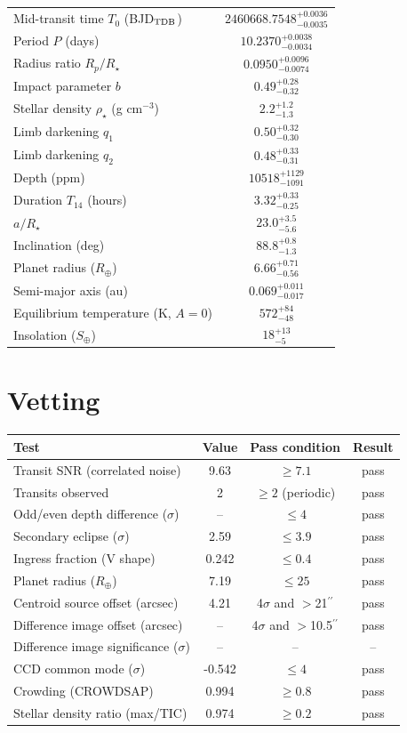 \documentclass[11pt,a4paper]{article}
\newcommand{\arcsec}{$^{\prime\prime}$}
\begin{document}
\begin{tabular}{lc}\toprule
Mid-transit time $T_0$ (BJD$_{\rm TDB}$) & $2460668.7548^{+0.0036}_{-0.0035}$ \\
Period $P$ (days) & $10.2370^{+0.0038}_{-0.0034}$ \\
Radius ratio $R_p/R_\star$ & $0.0950^{+0.0096}_{-0.0074}$ \\
Impact parameter $b$ & $0.49^{+0.28}_{-0.32}$ \\
Stellar density $\rho_\star$ (g cm$^{-3}$) & $2.2^{+1.2}_{-1.3}$ \\
Limb darkening $q_1$ & $0.50^{+0.32}_{-0.30}$ \\
Limb darkening $q_2$ & $0.48^{+0.33}_{-0.31}$ \\
Depth (ppm) & $10518^{+1129}_{-1091}$ \\
Duration $T_{14}$ (hours) & $3.32^{+0.33}_{-0.25}$ \\
$a/R_\star$ & $23.0^{+3.5}_{-5.6}$ \\
Inclination (deg) & $88.8^{+0.8}_{-1.3}$ \\
Planet radius ($R_\oplus$) & $6.66^{+0.71}_{-0.56}$ \\
Semi-major axis (au) & $0.069^{+0.011}_{-0.017}$ \\
Equilibrium temperature (K, $A=0$) & $572^{+84}_{-48}$ \\
Insolation ($S_\oplus$) & $18^{+13}_{-5}$ \\
\bottomrule\end{tabular}

\section*{Vetting}
\begin{tabular}{lccc}\toprule
Test & Value & Pass condition & Result \\\midrule
Transit SNR (correlated noise) & 9.63 & $\ge 7.1$ & pass \\
Transits observed & 2 & $\ge 2$ (periodic) & pass \\
Odd/even depth difference ($\sigma$) & -- & $\le 4$ & pass \\
Secondary eclipse ($\sigma$) & 2.59 & $\le 3.9$ & pass \\
Ingress fraction (V shape) & 0.242 & $\le 0.4$ & pass \\
Planet radius ($R_\oplus$) & 7.19 & $\le 25$ & pass \\
Centroid source offset (arcsec) & 4.21 & 4$\sigma$ and $>$21\arcsec & pass \\
Difference image offset (arcsec) & -- & 4$\sigma$ and $>$10.5\arcsec & pass \\
Difference image significance ($\sigma$) & -- & -- & -- \\
CCD common mode ($\sigma$) & -0.542 & $\le 4$ & pass \\
Crowding (CROWDSAP) & 0.994 & $\ge 0.8$ & pass \\
Stellar density ratio (max/TIC) & 0.974 & $\ge 0.2$ & pass \\
\bottomrule\end{tabular}
\end{document}
